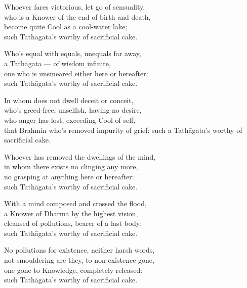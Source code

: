 \begin{MyDescription}{}
Whoever fares victorious, let go of sensuality,\\
who is a Knower of the end of birth and death,\\
become quite Cool as a cool-water lake;\\
such Tathagata's worthy of sacrificial cake.
\end{MyDescription}

\begin{MyDescription}{}
Who's equal with equals, unequals far away,\\
a Tath\=agata — of wisdom infinite,\\
one who is unsmeared either here or hereafter:\\
such Tath\=agata's worthy of sacrificial cake.
\end{MyDescription}

\begin{MyDescription}{}
In whom does not dwell deceit or conceit,\\
who's greed-free, unselfish, having no desire,\\
who anger has lost, exceeding Cool of self,\\
that Brahmin who's removed impurity of grief:
such a Tath\=agata's worthy of sacrificial cake.
\end{MyDescription}

\begin{MyDescription}{}
Whoever has removed the dwellings of the mind,\\
in whom there exists no clinging any more,\\
no grasping at anything here or hereafter:\\
such Tath\=agata's worthy of sacrificial cake.
\end{MyDescription}

\begin{MyDescription}{}
With a mind composed and crossed the flood,\\
a Knower of Dharma by the highest vision,\\
cleansed of pollutions, bearer of a last body:\\
such Tath\=agata's worthy of sacrificial cake.
\end{MyDescription}

\begin{MyDescription}{}
No pollutions for existence, neither harsh words,\\
not smouldering are they, to non-existence gone,\\
one gone to Knowledge, completely released:\\
such Tath\=agata's worthy of sacrificial cake.
\end{MyDescription}

